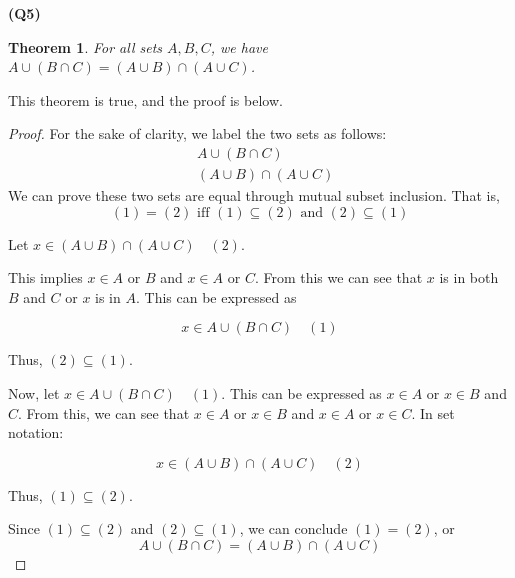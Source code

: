 \documentclass[12pt, a4paper]{article}
\newtheorem{theorem}{Theorem}
\begin{document}
\noindent\textbf{(Q5)}
\begin{theorem}
    For all sets $A,B,C$, we have $A \cup (B \cap C) = (A \cup B) \cap (A \cup C)$.
\end{theorem}

\newcommand{\A}{A \cup (B \cap C)}
\newcommand{\B}{(A \cup B) \cap (A \cup C)}
\newcommand{\sse}{\subseteq}

This theorem is true, and the proof is below.
\begin{proof}
    For the sake of clarity, we label the two sets as follows:
    \begin{align}
        & \A\\
        & \B
    \end{align}
    We can prove these two sets are equal through mutual subset inclusion. That is,
    \[
        (1) = (2) \text{ iff } (1) \sse (2) \text{ and } (2) \sse (1)
    \]

    Let $x \in \B \quad (2)$.

    This implies $x \in A$ or $B$ and $x \in A$ or $C$. From this we can see that
    $x$ is in both $B$ and $C$ or $x$ is in $A$. This can be expressed as

    \[
        x \in \A \quad (1)
    \]

    Thus, $(2) \sse (1)$.

    Now, let $x \in \A \quad (1)$.
    This can be expressed as $x \in A$ or $x \in B$ and $C$. From this, we can
    see that $x \in A$ or $x \in B$ and $x \in A$ or $x \in C$. In set notation:

    \[
        x \in \B \quad (2)
    \]

    Thus, $(1) \sse (2)$.

    Since $(1) \sse (2)$ and $(2) \sse (1)$, we can conclude $(1) = (2)$, or
    \[
        \A = \B
    \]
\end{proof}
\end{document}
